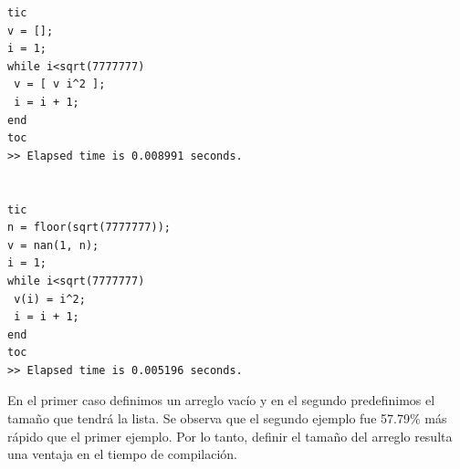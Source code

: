 \begin{lstlisting}
tic
v = [];
i = 1;
while i<sqrt(7777777)
 v = [ v i^2 ];
 i = i + 1;
end
toc
>> Elapsed time is 0.008991 seconds.


tic
n = floor(sqrt(7777777));
v = nan(1, n);
i = 1;
while i<sqrt(7777777)
 v(i) = i^2;
 i = i + 1;
end
toc
>> Elapsed time is 0.005196 seconds.

\end{lstlisting}


En el primer caso definimos un arreglo vacío y en el segundo predefinimos el tamaño que tendrá la lista. Se observa que el segundo ejemplo fue 57.79\% más rápido que el primer ejemplo. Por lo tanto, definir el tamaño del arreglo resulta una ventaja en el tiempo de compilación.






